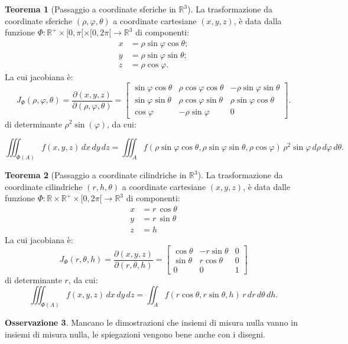 \documentclass[leqno]{article}
\theoremstyle{definition}
\numberwithin{equation}{section}
\newtheorem{theorem}{Teorema}[section]
\newtheorem{observation}[theorem]{Osservazione}
\theoremstyle{remark}
\begin{document}
	\begin{theorem}[Passaggio a coordinate sferiche in $\mathbb{R}^3$]
		La trasformazione da coordinate sferiche $(\rho,\varphi,\theta)$ a coordinate cartesiane $(x,y,z)$, è data dalla funzione $\Phi : \mathbb{R}^+ \times [0,\pi[ \times [0,2\pi[ \to \mathbb{R}^3$ di componenti:
		\begin{align*}
			x&=\rho \sin \varphi \cos \theta ;\\y&=\rho \sin \varphi \sin \theta ;\\z&=\rho \cos \varphi .
		\end{align*}
		La cui jacobiana è:
		\begin{equation}
			J _{\Phi}(\rho ,\varphi ,\theta )=\dfrac{\partial(x,y,z)}{\partial(\rho,\varphi,\theta)}={\begin{bmatrix}\sin \varphi \cos \theta &\rho \cos \varphi \cos \theta &-\rho \sin \varphi \sin \theta \\\sin \varphi \sin \theta &\rho \cos \varphi \sin \theta &\rho \sin \varphi \cos \theta \\\cos \varphi &-\rho \sin \varphi &0\end{bmatrix}}.
		\end{equation}
		di determinante $\rho^2 \sin(\varphi)$, da cui:
		
		\begin{equation}
			\iiint _{\Phi(A)}f(x,y,z)\,dx\,dy\,dz=\iiint _{A}f(\rho \sin \varphi \cos \theta ,\rho \sin \varphi \sin \theta ,\rho \cos \varphi )\,\rho ^{2}\sin \varphi \,d\rho \,d\varphi \,d\theta .
		\end{equation}
	\end{theorem}
	\begin{theorem}[Passaggio a coordinate cilindriche in $\mathbb{R}^3$]
		La trasformazione da coordinate cilindriche $(r,h,\theta)$ a coordinate cartesiane $(x,y,z)$, è data dalle funzione $\Phi : \mathbb{R} \times \mathbb{R}^+ \times [0,2\pi[ \to \mathbb{R}^3$ di componenti: 
		\begin{align*}
			x&=r\,\cos \theta \\y&=r\,\sin \theta \\z&=h 
		\end{align*}
		La cui jacobiana è:
		\begin{equation}
			J_{\Phi}(r,\theta ,h)={\frac {\partial (x,y,z)}{\partial (r,\theta ,h)}}={\begin{bmatrix}\cos \theta &-r\sin \theta &0\\\sin \theta &r\cos \theta &0 \\ 0 & 0 & 1\end{bmatrix}}
		\end{equation}
		di determinante $r$, da cui:
		\begin{equation}
			\iiint _{\Phi(A)}f(x,y,z)\,dx\,dy\,dz=\iint _{A}f(r\cos \theta ,r\sin \theta , h)\,r\,dr\,d\theta \, dh .
		\end{equation}
	\end{theorem}
	\begin{observation}
		Mancano le dimostrazioni che insiemi di misura nulla vanno in insiemi di misura nulla, le spiegazioni vengono bene anche con i disegni. 
	\end{observation}
\end{document}
